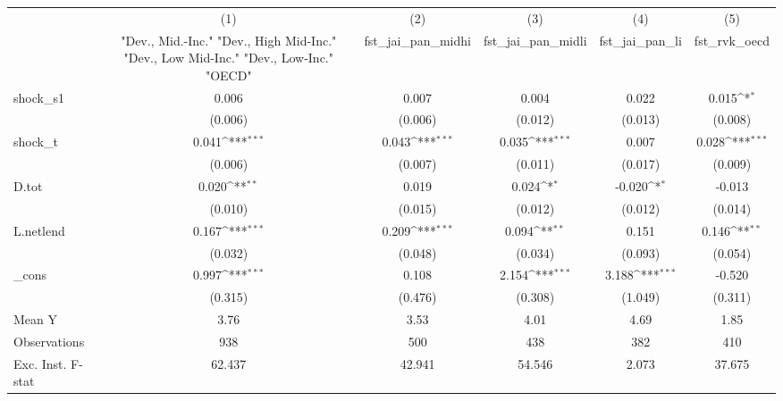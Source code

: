 {
\def\sym#1{\ifmmode^{#1}\else\(^{#1}\)\fi}
\begin{tabular}{l*{5}{c}}
\toprule
            &\multicolumn{1}{c}{(1)}&\multicolumn{1}{c}{(2)}&\multicolumn{1}{c}{(3)}&\multicolumn{1}{c}{(4)}&\multicolumn{1}{c}{(5)}\\
            &\multicolumn{1}{c}{ "Dev., Mid.-Inc." "Dev., High Mid-Inc." "Dev., Low Mid-Inc." "Dev., Low-Inc." "OECD" }&\multicolumn{1}{c}{fst\_jai\_pan\_midhi}&\multicolumn{1}{c}{fst\_jai\_pan\_midli}&\multicolumn{1}{c}{fst\_jai\_pan\_li}&\multicolumn{1}{c}{fst\_rvk\_oecd}\\
\midrule
shock\_s1    &       0.006         &       0.007         &       0.004         &       0.022         &       0.015\sym{*}  \\
            &     (0.006)         &     (0.006)         &     (0.012)         &     (0.013)         &     (0.008)         \\
\addlinespace
shock\_t     &       0.041\sym{***}&       0.043\sym{***}&       0.035\sym{***}&       0.007         &       0.028\sym{***}\\
            &     (0.006)         &     (0.007)         &     (0.011)         &     (0.017)         &     (0.009)         \\
\addlinespace
D.tot       &       0.020\sym{**} &       0.019         &       0.024\sym{*}  &      -0.020\sym{*}  &      -0.013         \\
            &     (0.010)         &     (0.015)         &     (0.012)         &     (0.012)         &     (0.014)         \\
\addlinespace
L.netlend   &       0.167\sym{***}&       0.209\sym{***}&       0.094\sym{**} &       0.151         &       0.146\sym{**} \\
            &     (0.032)         &     (0.048)         &     (0.034)         &     (0.093)         &     (0.054)         \\
\addlinespace
\_cons      &       0.997\sym{***}&       0.108         &       2.154\sym{***}&       3.188\sym{***}&      -0.520         \\
            &     (0.315)         &     (0.476)         &     (0.308)         &     (1.049)         &     (0.311)         \\
\midrule
Mean Y      &        3.76         &        3.53         &        4.01         &        4.69         &        1.85         \\
Observations&         938         &         500         &         438         &         382         &         410         \\
Exc. Inst. F-stat&      62.437         &      42.941         &      54.546         &       2.073         &      37.675         \\
\bottomrule
\end{tabular}
}
